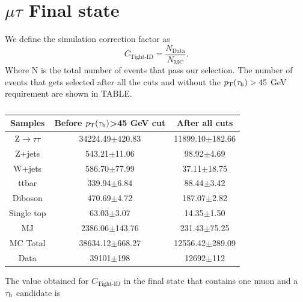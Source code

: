 \section{$\mu\tau$ Final state}
We define the simulation correction factor as
\begin{equation}
	C_{\text{Tight-ID}}=\frac{N_{\text{Data}}}{N_{\text{MC}}}.
\end{equation}
Where N is the total number of events that pass our selection. The number of events that gets selected after all the cuts and without the $p_\text{T}(\tau_\text{h})>45$ GeV requirement are shown in TABLE.
\begin{table}[H]
	\centering
	\begin{tabular}{ccc}
		\hline
		\multicolumn{1}{c|}{Samples} & \multicolumn{1}{c|}{Before $p_\text{T}(\tau_\text{h})$\textgreater{}45 GeV cut} & After all cuts      \\ \hline
		Z$\to\tau\tau$               & 34224.49$\pm$420.83                                              & 11899.10$\pm$182.66 \\
		Z+jets                       & 543.21$\pm$11.06                                                 & 98.92$\pm$4.69      \\
		W+jets                       & 586.70$\pm$77.99                                                 & 37.11$\pm$18.75     \\
		ttbar                        & 339.94$\pm$6.84                                                  & 88.44$\pm$3.42      \\
		Diboson                      & 470.69$\pm$4.72                                                  & 187.07$\pm$2.82     \\
		Single top                   & 63.03$\pm$3.07                                                   & 14.35$\pm$1.50      \\
		MJ                           & 2386.06$\pm$143.76                                               & 231.43$\pm$75.25    \\ \hline
		\multicolumn{1}{c|}{MC Total}   & \multicolumn{1}{c|}{38634.12$\pm$668.27}                         & 12556.42$\pm$289.09 \\ \hline
		\multicolumn{1}{c|}{Data}    & \multicolumn{1}{c|}{39101$\pm$198}                               & 12692$\pm$112       \\ \hline
	\end{tabular}
	\caption{}
	\label{tab:my-table}
\end{table}
The value obtained for $C_{\text{Tight-ID}}$ in the final state that contains one muon and a $\tau_\text{h}$ candidate is

